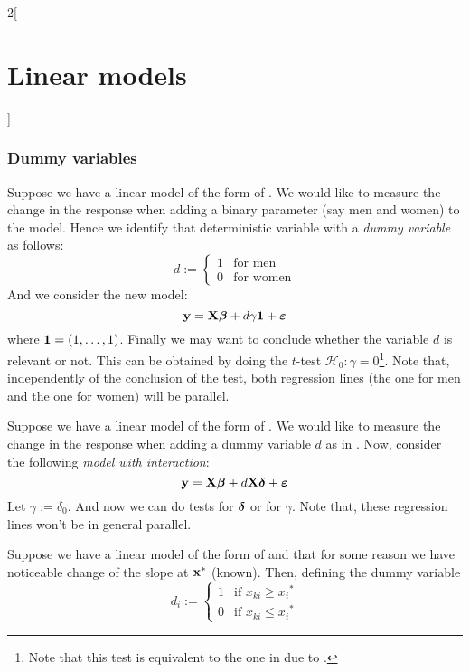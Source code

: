 \documentclass[../../../main_math.tex]{subfiles}
\begin{document}
\begin{multicols}{2}[\section{Linear models}]
  \subsubsection{Dummy variables}
  \begin{definition}
    Suppose we have a linear model of the form of . We would like to measure the change in the response when adding a binary parameter (say men and women) to the model. Hence we identify that deterministic variable with a \emph{dummy variable} as follows:
    \begin{equation}\label{LM:dummy}
      d:=
      \begin{cases}
        1 & \text{for men}   \\
        0 & \text{for women}
      \end{cases}
    \end{equation}
    And we consider the new model: $$\boldsymbol{\mathrm{y}}=\boldsymbol{\mathrm{X}}\boldsymbol{\mathrm{\beta}}+d\gamma\boldsymbol{\mathrm{1}}+\boldsymbol{\mathrm{\varepsilon}}$$
    where $\boldsymbol{\mathrm{1}}=(1,\ldots,1)$. Finally we may want to conclude whether the variable $d$ is relevant or not. This can be obtained by doing the $t$-test $\mathcal{H}_0:\gamma=0$\footnote{Note that this test is equivalent to the one in  due to .}. Note that, independently of the conclusion of the test, both regression lines (the one for men and the one for women) will be parallel.
  \end{definition}
  \begin{definition}
    Suppose we have a linear model of the form of . We would like to measure the change in the response when adding a dummy variable $d$ as in . Now, consider the following \emph{model with interaction}: $$\boldsymbol{\mathrm{y}}=\boldsymbol{\mathrm{X}}\boldsymbol{\mathrm{\beta}}+d\boldsymbol{\mathrm{X}}\boldsymbol{\mathrm{\delta}}+\boldsymbol{\mathrm{\varepsilon}}$$
    Let $\gamma:=\delta_0$. And now we can do tests for $\boldsymbol{\mathrm{\delta}}$ or for $\gamma$. Note that, these regression lines won't be in general parallel.
  \end{definition}
  \begin{definition}
    Suppose we have a linear model of the form of  and that for some reason we have noticeable change of the slope at $\boldsymbol{\mathrm{x}}^*$ (known). Then, defining the dummy variable
    \begin{equation}
      d_i:=
      \begin{cases}
        1 & \text{if }x_{ki}\geq {x_i}^* \\
        0 & \text{if }x_{ki}\leq {x_i}^*

\end{cases}
\end{equation}
\end{definition}
\end{multicols}
\end{document}
